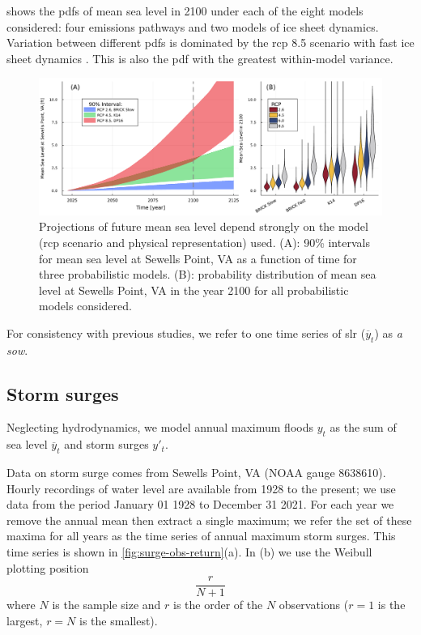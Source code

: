 \documentclass[12pt]{article}
\newcommand{\james}[1]{\todo[color=giallo, textcolor=nero]{\textbf{ATTN James:~}#1}} %
\begin{document}
 shows the \glspl{pdf} of mean sea level in 2100 under each of the eight models considered: four emissions pathways \citep[\gls{rcp} scenarios][]{moss_rcp:2010} and two models of ice sheet dynamics.
Variation between different \glspl{pdf} is dominated by the \gls{rcp} 8.5 scenario with fast ice sheet dynamics \citep[see][for a discussion of these dynamics]{wong_brick0.2:2017}.
This is also the \gls{pdf} with the greatest within-model variance.
\begin{figure}
    \centering
    \includegraphics[width=\textwidth]{lsl-evolution}
    \caption{
        Projections of future mean sea level depend strongly on the model (\gls{rcp} scenario and physical representation) used.
        (A): 90\% intervals for mean sea level at Sewells Point, VA as a function of time for three probabilistic models.
        (B): probability distribution of mean sea level at Sewells Point, VA in the year 2100 for all probabilistic models considered.
    }\label{fig:lsl-evolution}
\end{figure}

For consistency with previous studies, we refer to one time series of \gls{slr} ($\overline{y}_t$) as \emph{a \gls{sow}}.

\subsection{Storm surges}\label{sec:storm-surge}

Neglecting hydrodynamics, we model annual maximum floods $y_t$ as the sum of sea level $\overline{y}_t$ and storm surges $y'_t$.

Data on storm surge comes from Sewells Point, VA (NOAA gauge 8638610).\james{cite NOAA data source}
Hourly recordings of water level are available from 1928 to the present; we use data from the period January 01 1928 to December 31 2021.
For each year we remove the annual mean then extract a single maximum; we refer the set of these maxima for all years as the time series of annual maximum storm surges.
This time series is shown in \cref{fig:surge-obs-return}(a).
In (b) we use the Weibull plotting position
\begin{equation}\label{eq:plot-pos}
    \frac{r}{N + 1}
\end{equation}
where $N$ is the sample size and $r$ is the order of the $N$ observations ($r=1$ is the largest, $r=N$ is the smallest).
\end{document}
